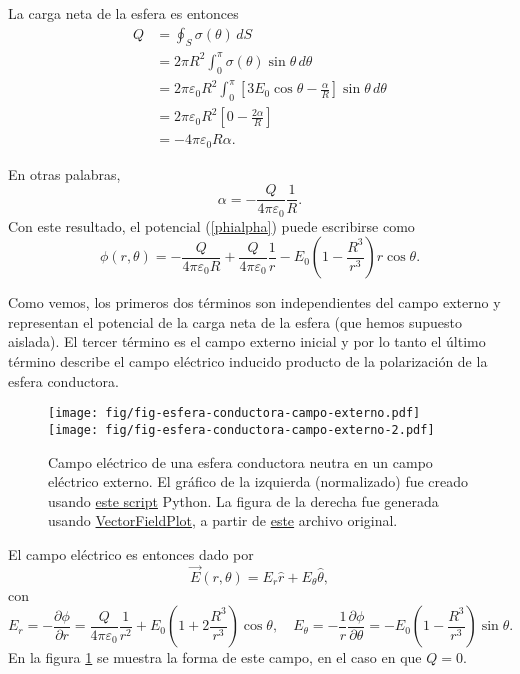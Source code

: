La carga neta de la esfera es entonces
\begin{align}
Q &= \oint_S\sigma(\theta)\,dS \\
&= 2\pi R^2 \int_0^\pi \sigma(\theta)\sin\theta\,d\theta \\
&= 2\pi \varepsilon_0R^2 \int_0^\pi \left[3E_0\cos\theta-\frac{\alpha}{R}\right] \sin\theta\,d\theta \\
&= 2\pi \varepsilon_0R^2 \left[ 0-\frac{2\alpha}{R}\right] \\
&= -4\pi \varepsilon_0R \alpha .
\end{align}

En otras palabras, 
\begin{equation}
\alpha=-\frac{Q}{4\pi \varepsilon_0}\frac{1}{R}.
\end{equation}
Con este resultado, el potencial (\ref{phialpha}) puede escribirse como 
\begin{equation}
\phi(r,\theta)=-\frac{Q}{4\pi\varepsilon_0 R}+\frac{Q}{4\pi\varepsilon_0}\frac{1}{r} -E_0 \left(1-\frac{R^3}{r^3}\right)r\cos\theta.
\end{equation}

Como vemos, los primeros dos términos son independientes del campo externo y representan el potencial de la carga neta de la esfera (que hemos supuesto aislada). El tercer término es el campo externo inicial y por lo tanto el último término describe el campo eléctrico inducido producto de la polarización de la esfera conductora.
\begin{figure}[!h]
\centerline{\texttt{[image: fig/fig-esfera-conductora-campo-externo.pdf]}
\hspace{1cm}
\texttt{[image: fig/fig-esfera-conductora-campo-externo-2.pdf]}}
\caption{Campo eléctrico de una esfera conductora neutra en un campo eléctrico externo. El gráfico de la izquierda (normalizado) fue creado usando \href{https://github.com/gfrubi/electrodinamica/blob/master/figuras-editables/fig-esfera-conductora-campo-externo-raw.py}{este script} Python. La figura de la derecha fue generada usando \href{http://commons.wikimedia.org/wiki/User:Geek3/VectorFieldPlot}{VectorFieldPlot}, a partir de \href{http://commons.wikimedia.org/wiki/File:VFPt_superconductor_ball_E-field.svg}{este} archivo original.}
\label{fig:ecce}
\end{figure}

El campo eléctrico es entonces dado por
\begin{equation}
\vec{E}(r,\theta) = E_r\hat{r}+E_\theta\hat{\theta},
\end{equation}
con 
\begin{equation}
E_r = -\frac{\partial\phi}{\partial r} = \frac{Q}{4\pi\varepsilon_0}\frac{1}{r^2}+E_0 \left(1+2\frac{R^3}{r^3}\right)\cos\theta, \quad E_\theta = -\frac{1}{r}\frac{\partial\phi}{\partial\theta} =-E_0 \left(1-\frac{R^3}{r^3}\right)\sin\theta .
\end{equation}
En la figura \ref{fig:ecce} se muestra la forma de este campo, en el caso en que $Q=0$.


